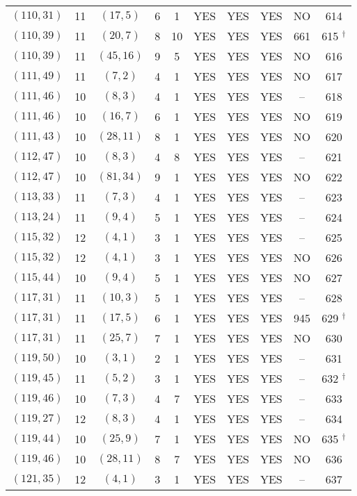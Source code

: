 \begin{longtable}{|c|c|c|c|c|c|c|c|c|c|}
$(110, 31)$ & 11 & $(17, 5)$ & 6 & 1 & YES & YES & YES & NO & 614\\
$(110, 39)$ & 11 & $(20, 7)$ & 8 & 10 & YES & YES & YES & 661 & 615 ${}^\dagger$\\
$(110, 39)$ & 11 & $(45, 16)$ & 9 & 5 & YES & YES & YES & NO & 616\\
$(111, 49)$ & 11 & $(7, 2)$ & 4 & 1 & YES & YES & YES & NO & 617\\
$(111, 46)$ & 10 & $(8, 3)$ & 4 & 1 & YES & YES & YES & -- & 618\\
$(111, 46)$ & 10 & $(16, 7)$ & 6 & 1 & YES & YES & YES & NO & 619\\
$(111, 43)$ & 10 & $(28, 11)$ & 8 & 1 & YES & YES & YES & NO & 620\\
$(112, 47)$ & 10 & $(8, 3)$ & 4 & 8 & YES & YES & YES & -- & 621\\
$(112, 47)$ & 10 & $(81, 34)$ & 9 & 1 & YES & YES & YES & NO & 622\\
$(113, 33)$ & 11 & $(7, 3)$ & 4 & 1 & YES & YES & YES & -- & 623\\
$(113, 24)$ & 11 & $(9, 4)$ & 5 & 1 & YES & YES & YES & -- & 624\\
$(115, 32)$ & 12 & $(4, 1)$ & 3 & 1 & YES & YES & YES & -- & 625\\
$(115, 32)$ & 12 & $(4, 1)$ & 3 & 1 & YES & YES & YES & NO & 626\\
$(115, 44)$ & 10 & $(9, 4)$ & 5 & 1 & YES & YES & YES & NO & 627\\
$(117, 31)$ & 11 & $(10, 3)$ & 5 & 1 & YES & YES & YES & -- & 628\\
$(117, 31)$ & 11 & $(17, 5)$ & 6 & 1 & YES & YES & YES & 945 & 629 ${}^\dagger$\\
$(117, 31)$ & 11 & $(25, 7)$ & 7 & 1 & YES & YES & YES & NO & 630\\
$(119, 50)$ & 10 & $(3, 1)$ & 2 & 1 & YES & YES & YES & -- & 631\\
$(119, 45)$ & 11 & $(5, 2)$ & 3 & 1 & YES & YES & YES & -- & 632 ${}^\dagger$\\
$(119, 46)$ & 10 & $(7, 3)$ & 4 & 7 & YES & YES & YES & -- & 633\\
$(119, 27)$ & 12 & $(8, 3)$ & 4 & 1 & YES & YES & YES & -- & 634\\
$(119, 44)$ & 10 & $(25, 9)$ & 7 & 1 & YES & YES & YES & NO & 635 ${}^\dagger$\\
$(119, 46)$ & 10 & $(28, 11)$ & 8 & 7 & YES & YES & YES & NO & 636\\
$(121, 35)$ & 12 & $(4, 1)$ & 3 & 1 & YES & YES & YES & -- & 637\\

\end{longtable}
